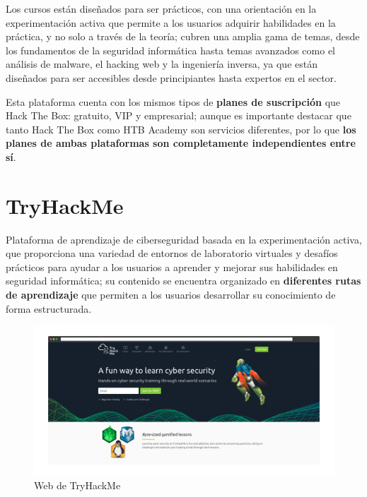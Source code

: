         Los cursos están diseñados para ser prácticos, con una orientación en la experimentación activa que permite a los usuarios adquirir habilidades en la práctica, y no solo a través de la teoría; cubren una amplia gama de temas, desde los fundamentos de la seguridad informática hasta temas avanzados como el análisis de malware, el hacking web y la ingeniería inversa, ya que están diseñados para ser accesibles desde principiantes hasta expertos en el sector.
        
        Esta plataforma cuenta con los mismos tipos de \textbf{planes de suscripción} que Hack The Box: gratuito, VIP y empresarial; aunque es importante destacar que tanto Hack The Box como HTB Academy son servicios diferentes, por lo que \textbf{los planes de ambas plataformas son completamente independientes entre sí}.
        
        \newpage
    
    
    \section{TryHackMe}
    
        Plataforma de aprendizaje de ciberseguridad basada en la experimentación activa, que proporciona una variedad de entornos de laboratorio virtuales y desafíos prácticos para ayudar a los usuarios a aprender y mejorar sus habilidades en seguridad informática; su contenido se encuentra organizado en \textbf{diferentes rutas de aprendizaje} que permiten a los usuarios desarrollar su conocimiento de forma estructurada.
        
        \begin{figure}[h]
            \centering

            \includegraphics[width=\textwidth]{images/Capturas/Web de THM.png}

            \caption{Web de TryHackMe}
            \label{fig:THM-web}
        \end{figure}
        
